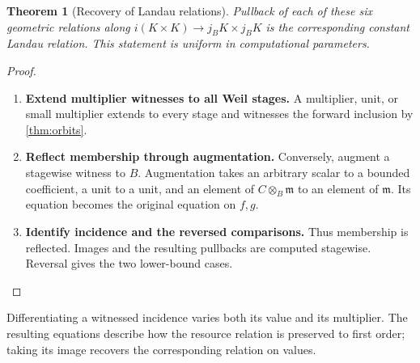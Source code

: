 \documentclass[11pt,a4paper]{article}
\numberwithin{algorithm}{section}
\numberwithin{equation}{section}
\newtheorem{theorem}{Theorem}[section]
\theoremstyle{definition}
\theoremstyle{remark}
\theoremstyle{plain}
\theoremstyle{definition}
\theoremstyle{plain}
\begin{document}
\begin{theorem}[Recovery of Landau relations]\label{thm:all-incidence}
Pullback of each of these six geometric relations along
$i(K\times K)\to j_BK\times j_BK$ is the corresponding
constant Landau relation. This statement is uniform
in computational parameters.
\end{theorem}
\begin{proof}\leavevmode
\begin{enumerate}[leftmargin=*,align=left]
\item \textbf{Extend multiplier witnesses to all Weil stages.}
A multiplier, unit, or small multiplier extends to
every stage and witnesses the forward inclusion by
\cref{thm:orbits}.

\item \textbf{Reflect membership through augmentation.}
Conversely, augment a stagewise witness
to $B$. Augmentation takes an arbitrary scalar to a bounded
coefficient, a unit to a unit, and an element of
$C\otimes_B\mathfrak m$ to an element of $\mathfrak m$.
Its equation becomes the original equation on $f,g$.

\item \textbf{Identify incidence and the reversed comparisons.}
Thus membership is reflected. Images and the resulting pullbacks are computed stagewise. Reversal gives the two lower-bound cases.
\end{enumerate}
\end{proof}

Differentiating a witnessed incidence varies both its value and
its multiplier. The resulting equations describe how the resource
relation is preserved to first order; taking its image recovers
the corresponding relation on values.
\end{document}

